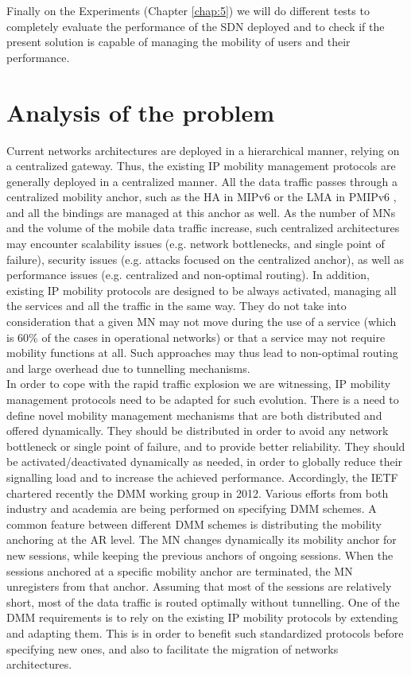 Finally on the Experiments (Chapter \ref{chap:5}) we will do different tests to completely evaluate the performance of the SDN deployed and to check if the present solution is capable of managing the mobility of users and their performance.

\section{Analysis of the problem}\label{sec:chap1_analysis_of_the_problem}
Current networks architectures are deployed in a hierarchical manner, relying on a centralized gateway. Thus, the existing IP mobility management protocols are generally deployed in a centralized manner. All the data traffic passes through a centralized mobility anchor, such as the HA in MIPv6 \cite{mipv6} or the LMA in PMIPv6 \cite{pmipv6}, and all the bindings are managed at this anchor as well. As the number of MNs and the volume of the mobile data traffic increase, such centralized architectures may encounter scalability issues (e.g. network bottlenecks, and single point of failure), security issues (e.g. attacks focused on the centralized anchor), as well as performance issues (e.g. centralized and non-optimal routing). In addition, existing IP mobility protocols are designed to be always activated, managing all the services and all the traffic in the same way. They do not take into consideration that a given MN may not move during the use of a service (which is 60\% of the cases in operational networks) or that a service may not require mobility functions at all. Such approaches may thus lead to non-optimal routing and large overhead due to tunnelling mechanisms.\\

In order to cope with the rapid traffic explosion we are witnessing, IP mobility management protocols need to be adapted for such evolution. There is a need to define novel mobility management mechanisms that are both distributed and offered dynamically. They should be distributed in order to avoid any network bottleneck or single point of failure, and to provide better reliability. They should be activated/deactivated dynamically as needed, in order to globally reduce their signalling load and to increase the achieved performance.
Accordingly, the IETF chartered recently the DMM working group in 2012. Various efforts from both industry and academia are being performed on specifying DMM schemes. A common feature between different DMM schemes is distributing the mobility anchoring at the AR level. The MN changes dynamically its mobility anchor for new sessions, while keeping the previous anchors of ongoing sessions. When the sessions anchored at a specific mobility anchor are terminated, the MN unregisters from that anchor. Assuming that most of the sessions are relatively short, most of the data traffic is routed optimally without tunnelling.
One of the DMM requirements is to rely on the existing IP mobility protocols by extending and adapting them. This is in order to benefit such standardized protocols before specifying new ones, and also to facilitate the migration of networks architectures. \\

